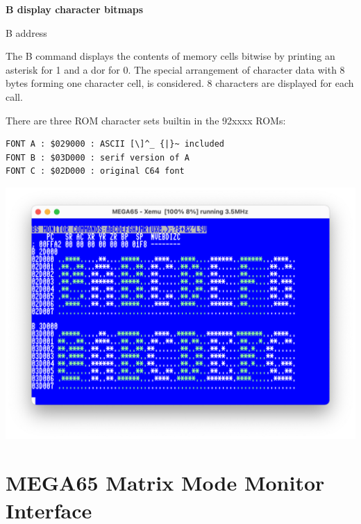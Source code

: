 \begin{description}[leftmargin=2cm,style=nextline]
\item [Format:] {\bf B display character bitmaps}
\item [Usage:] B address

\item [Remarks:] The B command displays the contents of memory cells bitwise
                 by printing an asterisk for 1 and a dor for 0.
                 The special arrangement of character data with 8 bytes
                 forming one character cell, is considered.
                 8 characters are displayed for each call.

                 There are three ROM character sets builtin
                 in the 92xxxx ROMs:

\begin{tcolorbox}[colback=blue,coltext=white]
\verbatimfont{\codefont}
\begin{verbatim}
FONT A : $029000 : ASCII [\]^_ {|}~ included
FONT B : $03D000 : serif version of A
FONT C : $02D000 : original C64 font
\end{verbatim}
\end{tcolorbox}
\end{description}
\includegraphics[width=\linewidth]{images/monitor-b}





\section{MEGA65 Matrix Mode Monitor Interface}

